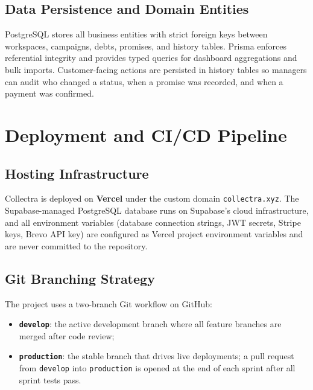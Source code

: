 \documentclass[12pt,a4paper]{report}
\begin{document}
\subsection{Data Persistence and Domain Entities}

PostgreSQL stores all business entities with strict foreign keys between workspaces,
campaigns, debts, promises, and history tables.
Prisma enforces referential integrity and provides typed queries for dashboard
aggregations and bulk imports.
Customer-facing actions are persisted in history tables so managers can audit who
changed a status, when a promise was recorded, and when a payment was confirmed.

\section{Deployment and CI/CD Pipeline}
\label{sec:deployment}

\subsection{Hosting Infrastructure}

Collectra is deployed on \textbf{Vercel} under the custom domain
\texttt{collectra.xyz}.
The Supabase-managed PostgreSQL database runs on Supabase's cloud infrastructure,
and all environment variables (database connection strings, JWT secrets, Stripe keys,
Brevo API key) are configured as Vercel project environment variables and are never
committed to the repository.

\subsection{Git Branching Strategy}

The project uses a two-branch Git workflow on GitHub:

\begin{itemize}
  \item \textbf{\texttt{develop}}: the active development branch where all feature
        branches are merged after code review;
  \item \textbf{\texttt{production}}: the stable branch that drives live deployments;
        a pull request from \texttt{develop} into \texttt{production} is opened at
        the end of each sprint after all sprint tests pass.
\end{itemize}
\end{document}
